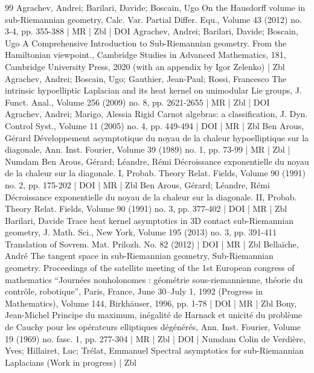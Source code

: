 \begin{thebibliography}{99}
Agrachev, Andrei; Barilari, Davide; Boscain, Ugo On the Hausdorff volume in sub-Riemannian geometry, Calc. Var. Partial Differ. Equ., Volume 43 (2012) no. 3-4, pp. 355-388 | MR | Zbl | DOI
Agrachev, Andrei; Barilari, Davide; Boscain, Ugo A Comprehensive Introduction to Sub-Riemannian geometry. From the Hamiltonian viewpoint., Cambridge Studies in Advanced Mathematics, 181, Cambridge University Press, 2020 (with an appendix by Igor Zelenko) | Zbl
Agrachev, Andrei; Boscain, Ugo; Gauthier, Jean-Paul; Rossi, Francesco The intrinsic hypoelliptic Laplacian and its heat kernel on unimodular Lie groups, J. Funct. Anal., Volume 256 (2009) no. 8, pp. 2621-2655 | MR | Zbl | DOI
Agrachev, Andrei; Marigo, Alessia Rigid Carnot algebras: a classification, J. Dyn. Control Syst., Volume 11 (2005) no. 4, pp. 449-494 | DOI | MR | Zbl
Ben Arous, Gérard Développement asymptotique du noyau de la chaleur hypoelliptique sur la diagonale, Ann. Inst. Fourier, Volume 39 (1989) no. 1, pp. 73-99 | MR | Zbl | Numdam
Ben Arous, Gérard; Léandre, Rémi Décroissance exponentielle du noyau de la chaleur sur la diagonale. I, Probab. Theory Relat. Fields, Volume 90 (1991) no. 2, pp. 175-202 | DOI | MR | Zbl
Ben Arous, Gérard; Léandre, Rémi Décroissance exponentielle du noyau de la chaleur sur la diagonale. II, Probab. Theory Relat. Fields, Volume 90 (1991) no. 3, pp. 377-402 | DOI | MR | Zbl
Barilari, Davide Trace heat kernel asymptotics in 3D contact sub-Riemannian geometry, J. Math. Sci., New York, Volume 195 (2013) no. 3, pp. 391-411 Translation of Sovrem. Mat. Prilozh. No. 82 (2012) | DOI | MR | Zbl
Bellaïche, André The tangent space in sub-Riemannian geometry, Sub-Riemannian geometry. Proceedings of the satellite meeting of the 1st European congress of mathematics “Journées nonholonomes : géométrie sous-riemannienne, théorie du contrôle, robotique”, Paris, France, June 30–July 1, 1992 (Progress in Mathematics), Volume 144, Birkhäuser, 1996, pp. 1-78 | DOI | MR | Zbl
Bony, Jean-Michel Principe du maximum, inégalité de Harnack et unicité du problème de Cauchy pour les opérateurs elliptiques dégénérés, Ann. Inst. Fourier, Volume 19 (1969) no. fasc. 1, pp. 277-304 | MR | Zbl | DOI | Numdam
Colin de Verdière, Yves; Hillairet, Luc; Trélat, Emmanuel Spectral asymptotics for sub-Riemannian Laplacians (Work in progress) | Zbl

\end{thebibliography}
